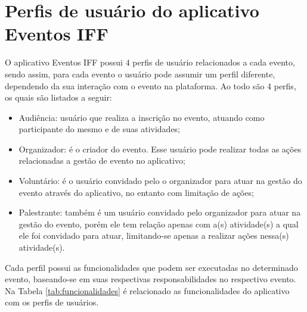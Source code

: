 \section{Perfis de usuário do aplicativo Eventos IFF}

O aplicativo Eventos IFF possui 4 perfis de usuário relacionados a cada evento, sendo assim, para cada evento o usuário pode assumir um perfil diferente, dependendo da sua interação com o evento na plataforma. Ao todo são 4 perfis, os quais são listados a seguir:

\begin{itemize}
    \item Audiência: usuário que realiza a inscrição no evento, atuando como participante do mesmo e de suas atividades;
    \item Organizador: é o criador do evento. Esse usuário pode realizar todas as ações relacionadas a gestão de evento no aplicativo;
    \item Voluntário: é o usuário convidado pelo o organizador para atuar na gestão do evento através do aplicativo, no entanto com limitação de ações;
    \item Palestrante: também é um usuário convidado pelo organizador para atuar na gestão do evento, porém ele tem relação apenas com a(s) atividade(s) a qual ele foi convidado para atuar, limitando-se apenas a realizar ações nessa(s) atividade(s).
\end{itemize}

Cada perfil possui as funcionalidades que podem ser executadas no determinado evento, baseando-se em suas respectivas responsabilidades no respectivo evento. Na Tabela \ref{tab:funcionalidades} é relacionado as funcionalidades do aplicativo com os perfis de usuários.

